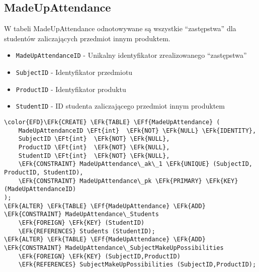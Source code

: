 \documentclass[11pt]{article}
\newcommand{\EFk}[1]{\textcolor{EFk}{\textbf{#1}}} %
\newcommand{\EFf}[1]{\textcolor{EFf}{#1}} %
\newcommand{\EFt}[1]{\textcolor{EFt}{\textbf{#1}}} %
\begin{document}
\subsection{MadeUpAttendance}
\label{sec:org11f55b7}
W tabeli MadeUpAttendance odnotowywane są wszystkie ``zastępstwa'' dla studentów zaliczających przedmiot innym produktem.
\begin{itemize}
\item \texttt{MadeUpAttendanceID} - Unikalny identyfikator zrealizowanego ``zastępstwa''
\item \texttt{SubjectID} - Identyfikator przedmiotu
\item \texttt{ProductID} - Identyfikator produktu
\item \texttt{StudentID} - ID studenta zaliczającego przedmiot innym produktem
\end{itemize}
\begin{Code}
\begin{Verbatim}
\color{EFD}\EFk{CREATE} \EFk{TABLE} \EFf{MadeUpAttendance} (
    MadeUpAttendanceID \EFt{int}  \EFk{NOT} \EFk{NULL} \EFk{IDENTITY},
    SubjectID \EFt{int}  \EFk{NOT} \EFk{NULL},
    ProductID \EFt{int}  \EFk{NOT} \EFk{NULL},
    StudentID \EFt{int}  \EFk{NOT} \EFk{NULL},
    \EFk{CONSTRAINT} MadeUpAttendance\_ak\_1 \EFk{UNIQUE} (SubjectID, ProductID, StudentID),
    \EFk{CONSTRAINT} MadeUpAttendance\_pk \EFk{PRIMARY} \EFk{KEY}  (MadeUpAttendanceID)
);
\EFk{ALTER} \EFk{TABLE} \EFf{MadeUpAttendance} \EFk{ADD} \EFk{CONSTRAINT} MadeUpAttendance\_Students
    \EFk{FOREIGN} \EFk{KEY} (StudentID)
    \EFk{REFERENCES} Students (StudentID);
\EFk{ALTER} \EFk{TABLE} \EFf{MadeUpAttendance} \EFk{ADD} \EFk{CONSTRAINT} MadeUpAttendance\_SubjectMakeUpPossibilities
    \EFk{FOREIGN} \EFk{KEY} (SubjectID,ProductID)
    \EFk{REFERENCES} SubjectMakeUpPossibilities (SubjectID,ProductID);
\end{Verbatim}
\end{Code}
\end{document}
